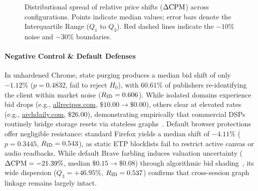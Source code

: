 \begin{figure}[t]
\centering
{}
\caption{Distributional spread of relative price shifts ($\Delta\text{CPM}$) across configurations. Points indicate median values; error bars denote the Interquartile Range ($Q_1$ to $Q_3$). Red dashed lines indicate the $-10\%$ noise and $-30\%$ \htr boundaries.}
\label{fig:iqr_spread}
\end{figure}

\paragraph{Negative Control \& Default Defenses}
In unhardened Chrome, state purging produces a median bid shift of only $-1.12\%$ ($p = 0.4832$, fail to reject $H_0$), with $60.61\%$ of publishers re-identifying the client within market noise ($R_{\text{ID}} = 0.606$). 
While isolated domains experience bid drops (e.g., \url{allrecipes.com}, $\$10.00 \to \$0.00$), others clear at elevated rates (e.g., \url{archdaily.com}, $\$26.00$), demonstrating empirically that commercial DSPs routinely bridge storage resets via stateless graphs~\cite{acar2014web, liu2025first}. 
Default browser protections offer negligible resistance: standard Firefox yields a median shift of $-4.11\%$ ($p = 0.3445$, $R_{\text{ID}} = 0.543$), as static ETP blocklists fail to restrict active canvas or audio readbacks. 
While default Brave farbling induces valuation uncertainty ($\Delta\text{CPM} = -21.39\%$, median $\$0.15 \to \$0.08$) through algorithmic bid shading~\cite{barysei2023investigating}, its wide dispersion ($Q_3 = +46.95\%$, $R_{\text{ID}} = 0.537$) confirms that cross-session graph linkage remains largely intact.

